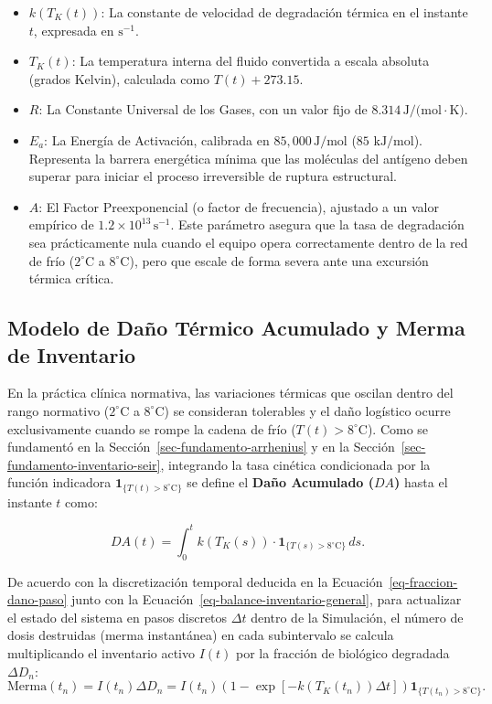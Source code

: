 \documentclass[
  spanish,
  us-letterpaper,
]{scrreprt}
\providecommand{\tightlist}{%
  \setlength{\itemsep}{0pt}\setlength{\parskip}{0pt}}
\numberwithin{equation}{section}
\theoremstyle{plain}
\theoremstyle{plain}
\theoremstyle{definition}
\theoremstyle{plain}
\theoremstyle{remark}
\begin{document}
\begin{itemize}
\tightlist
\item
  \textbf{\(k(T_K(t))\)}: La constante de velocidad de degradación
  térmica en el instante \(t\), expresada en \(\text{s}^{-1}\).
\item
  \textbf{\(T_K(t)\)}: La temperatura interna del fluido convertida a
  escala absoluta (grados Kelvin), calculada como \(T(t) + 273.15\).
\item
  \textbf{\(R\)}: La Constante Universal de los Gases, con un valor fijo
  de \(8.314 \, \text{J/(mol} \cdot \text{K)}\).
\item
  \textbf{\(E_a\)}: La Energía de Activación, calibrada en
  \textbf{\(85,000 \, \text{J/mol}\)} (\(85 \text{ kJ/mol}\)).
  Representa la barrera energética mínima que las moléculas del antígeno
  deben superar para iniciar el proceso irreversible de ruptura
  estructural.
\item
  \textbf{\(A\)}: El Factor Preexponencial (o factor de frecuencia),
  ajustado a un valor empírico de
  \textbf{\(1.2 \times 10^{13} \, \text{s}^{-1}\)}. Este parámetro
  asegura que la tasa de degradación sea prácticamente nula cuando el
  equipo opera correctamente dentro de la red de frío
  (\(2^\circ\text{C}\) a \(8^\circ\text{C}\)), pero que escale de forma
  severa ante una excursión térmica crítica.
\end{itemize}

\subsection{Modelo de Daño Térmico Acumulado y Merma de
Inventario}\label{modelo-de-dauxf1o-tuxe9rmico-acumulado-y-merma-de-inventario}

En la práctica clínica normativa, las variaciones térmicas que oscilan
dentro del rango normativo (\(2^\circ\text{C}\) a \(8^\circ\text{C}\))
se consideran tolerables y el daño logístico ocurre exclusivamente
cuando se rompe la cadena de frío (\(T(t) > 8^\circ\text{C}\)). Como se
fundamentó en la Sección~\ref{sec-fundamento-arrhenius} y en la
Sección~\ref{sec-fundamento-inventario-seir}, integrando la tasa
cinética condicionada por la función indicadora
\(\mathbf{1}_{\{T(t) > 8^\circ\text{C}\}}\) se define el \textbf{Daño
Acumulado (\(DA\))} hasta el instante \(t\) como:

\[
DA(t) = \int_{0}^{t} k(T_K(s)) \cdot \mathbf{1}_{\{T(s) > 8^\circ\text{C}\}} \, ds.
\]

De acuerdo con la discretización temporal deducida en la
Ecuación~\ref{eq-fraccion-dano-paso} junto con la
Ecuación~\ref{eq-balance-inventario-general}, para actualizar el estado
del sistema en pasos discretos \(\Delta t\) dentro de la Simulación, el
número de dosis destruidas (merma instantánea) en cada subintervalo se
calcula multiplicando el inventario activo \(I(t)\) por la fracción de
biológico degradada \(\Delta D_n\): \[
\text{Merma}(t_n) = I(t_n) \Delta D_n = I(t_n) \left( 1 - \exp\left[ -k(T_K(t_n)) \Delta t \right] \right) \mathbf{1}_{\{T(t_n) > 8^\circ\text{C}\}}.
\]
\end{document}
